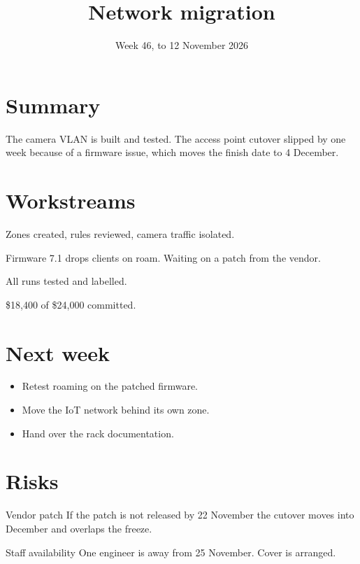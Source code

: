 \documentclass{jupiter-form}
\title{Network migration}
\subtitle{Week 46, to 12 November 2026}
\begin{document}
\maketitle
{}
\jprowend

\section{Summary}
The camera VLAN is built and tested. The access point cutover slipped by one week because of a firmware issue, which moves the finish date to 4 December.

\section{Workstreams}
Zones created, rules reviewed, camera traffic isolated.

Firmware 7.1 drops clients on roam. Waiting on a patch from the vendor.

All runs tested and labelled.

\jpmono\small \$18,400 of \$24,000 committed.

\section{Next week}
\begin{itemize}
  \item Retest roaming on the patched firmware.
  \item Move the IoT network behind its own zone.
  \item Hand over the rack documentation.
\end{itemize}

\section{Risks}
\begin{jpcallout}[warn]{Vendor patch}
If the patch is not released by 22 November the cutover moves into December and overlaps the freeze.
\end{jpcallout}
\begin{jpcallout}[info]{Staff availability}
One engineer is away from 25 November. Cover is arranged.
\end{jpcallout}
\end{document}

